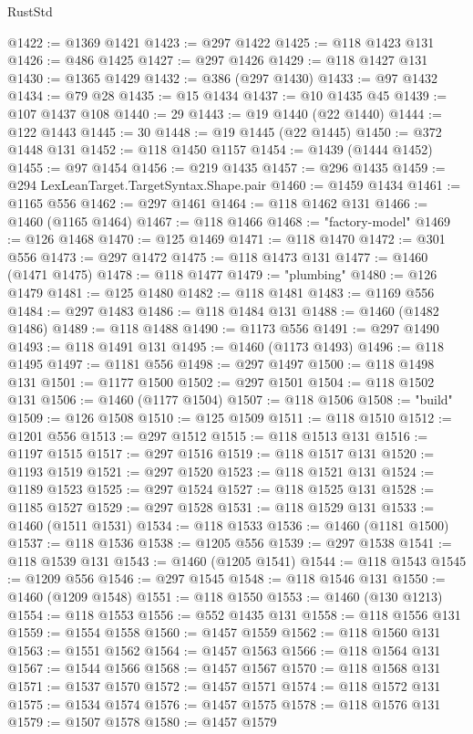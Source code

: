 \begin{lexlean}{RustStd}
\begin{coremodule}
@1422 := @1369 @1421
@1423 := @297 @1422
@1425 := @118 @1423 @131
@1426 := @486 @1425
@1427 := @297 @1426
@1429 := @118 @1427 @131
@1430 := @1365 @1429
@1432 := @386 (@297 @1430)
@1433 := @97 @1432
@1434 := @79 @28
@1435 := @15 @1434
@1437 := @10 @1435 @45
@1439 := @107 @1437 @108
@1440 := 29
@1443 := @19 @1440 (@22 @1440)
@1444 := @122 @1443
@1445 := 30
@1448 := @19 @1445 (@22 @1445)
@1450 := @372 @1448 @131
@1452 := @118 @1450 @1157
@1454 := @1439 (@1444 @1452)
@1455 := @97 @1454
@1456 := @219 @1435
@1457 := @296 @1435
@1459 := @294 LexLeanTarget.TargetSyntax.Shape.pair
@1460 := @1459 @1434
@1461 := @1165 @556
@1462 := @297 @1461
@1464 := @118 @1462 @131
@1466 := @1460 (@1165 @1464)
@1467 := @118 @1466
@1468 := "factory-model"
@1469 := @126 @1468
@1470 := @125 @1469
@1471 := @118 @1470
@1472 := @301 @556
@1473 := @297 @1472
@1475 := @118 @1473 @131
@1477 := @1460 (@1471 @1475)
@1478 := @118 @1477
@1479 := "plumbing"
@1480 := @126 @1479
@1481 := @125 @1480
@1482 := @118 @1481
@1483 := @1169 @556
@1484 := @297 @1483
@1486 := @118 @1484 @131
@1488 := @1460 (@1482 @1486)
@1489 := @118 @1488
@1490 := @1173 @556
@1491 := @297 @1490
@1493 := @118 @1491 @131
@1495 := @1460 (@1173 @1493)
@1496 := @118 @1495
@1497 := @1181 @556
@1498 := @297 @1497
@1500 := @118 @1498 @131
@1501 := @1177 @1500
@1502 := @297 @1501
@1504 := @118 @1502 @131
@1506 := @1460 (@1177 @1504)
@1507 := @118 @1506
@1508 := "build"
@1509 := @126 @1508
@1510 := @125 @1509
@1511 := @118 @1510
@1512 := @1201 @556
@1513 := @297 @1512
@1515 := @118 @1513 @131
@1516 := @1197 @1515
@1517 := @297 @1516
@1519 := @118 @1517 @131
@1520 := @1193 @1519
@1521 := @297 @1520
@1523 := @118 @1521 @131
@1524 := @1189 @1523
@1525 := @297 @1524
@1527 := @118 @1525 @131
@1528 := @1185 @1527
@1529 := @297 @1528
@1531 := @118 @1529 @131
@1533 := @1460 (@1511 @1531)
@1534 := @118 @1533
@1536 := @1460 (@1181 @1500)
@1537 := @118 @1536
@1538 := @1205 @556
@1539 := @297 @1538
@1541 := @118 @1539 @131
@1543 := @1460 (@1205 @1541)
@1544 := @118 @1543
@1545 := @1209 @556
@1546 := @297 @1545
@1548 := @118 @1546 @131
@1550 := @1460 (@1209 @1548)
@1551 := @118 @1550
@1553 := @1460 (@130 @1213)
@1554 := @118 @1553
@1556 := @552 @1435 @131
@1558 := @118 @1556 @131
@1559 := @1554 @1558
@1560 := @1457 @1559
@1562 := @118 @1560 @131
@1563 := @1551 @1562
@1564 := @1457 @1563
@1566 := @118 @1564 @131
@1567 := @1544 @1566
@1568 := @1457 @1567
@1570 := @118 @1568 @131
@1571 := @1537 @1570
@1572 := @1457 @1571
@1574 := @118 @1572 @131
@1575 := @1534 @1574
@1576 := @1457 @1575
@1578 := @118 @1576 @131
@1579 := @1507 @1578
@1580 := @1457 @1579

\end{coremodule}
\end{lexlean}
